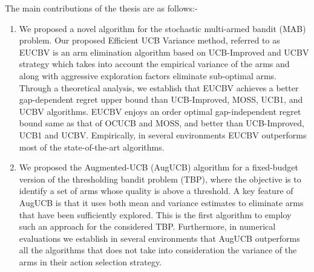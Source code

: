 The main contributions of the thesis are as follows:-
\begin{enumerate}
\item We proposed a novel algorithm for the stochastic multi-armed bandit (MAB) problem. Our proposed Efficient UCB Variance method, referred to as EUCBV is an arm elimination algorithm based on UCB-Improved and UCBV strategy which takes into account the empirical variance of the arms and along with aggressive exploration factors eliminate sub-optimal arms. Through a theoretical analysis, we establish that EUCBV achieves a better gap-dependent regret upper bound than UCB-Improved, MOSS, UCB1, and UCBV algorithms. EUCBV enjoys an order optimal gap-independent regret bound same as that of OCUCB and MOSS, and better than UCB-Improved, UCB1 and UCBV. Empirically, in several environments EUCBV outperforms most of the state-of-the-art algorithms. 

\item We proposed the Augmented-UCB (AugUCB) algorithm for a fixed-budget version of the thresholding bandit problem (TBP), where the objective is to identify a set of arms whose quality is above a threshold. A key feature of AugUCB is that it uses both mean and variance estimates to eliminate arms that have been sufficiently explored. This is the first algorithm to employ such an approach for the considered TBP. Furthermore, in numerical evaluations we establish in several environments that AugUCB outperforms all the algorithms that does not take into consideration the variance of the arms in their action selection strategy.

\end{enumerate}
 
